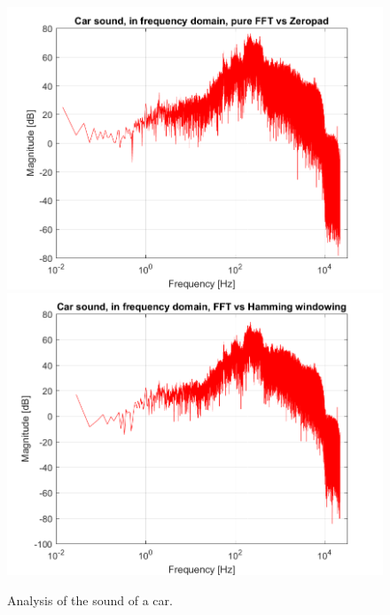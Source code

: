 \begin{figure}[htb]
	{\includegraphics[width=0.45\linewidth]{code/Car_figure4.png}}
	{\includegraphics[width=0.45\linewidth]{code/Car_figure5.png}}
	\caption{Analysis of the sound of a car.}\label{fig:car}
\end{figure}

